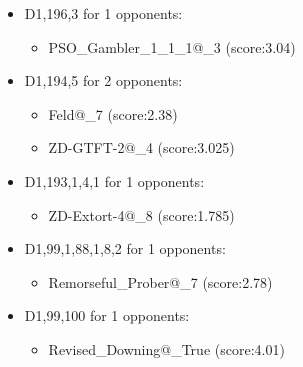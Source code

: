 \begin{appendices}
\begin{itemize}
\begin{multicols}{3}
\begin{itemize}
                \item PSO\_Gambler\_1\_1\_1@\_1 (score:3.02)
                \item PSO\_Gambler\_1\_1\_1@\_8 (score:3.02)
                \item Winner12 (score:3.02)
                \item Winner21 (score:3.0)
            \end{itemize}
        \end{multicols}

        \item D1,196,3 for 1 opponents:
        \begin{multicols}{3}
            \begin{itemize}
                \item PSO\_Gambler\_1\_1\_1@\_3 (score:3.04)
            \end{itemize}
        \end{multicols}

        \item D1,194,5 for 2 opponents:
        \begin{multicols}{3}
            \begin{itemize}
                \item Feld@\_7 (score:2.38)
                \item ZD-GTFT-2@\_4 (score:3.025)
            \end{itemize}
        \end{multicols}

        \item D1,193,1,4,1 for 1 opponents:
        \begin{multicols}{3}
            \begin{itemize}
                \item ZD-Extort-4@\_8 (score:1.785)
            \end{itemize}
        \end{multicols}

        \item D1,99,1,88,1,8,2 for 1 opponents:
        \begin{multicols}{3}
            \begin{itemize}
                \item Remorseful\_Prober@\_7 (score:2.78)
            \end{itemize}
        \end{multicols}

        \item D1,99,100 for 1 opponents:
        \begin{multicols}{3}
            \begin{itemize}
                \item Revised\_Downing@\_True (score:4.01)
            \end{itemize}
        \end{multicols}


\end{itemize}
\end{appendices}
